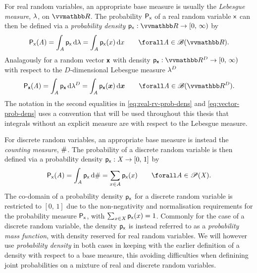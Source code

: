 For real random variables, an appropriate base measure is usually the \emph{Lebesgue measure}, $\lebm{1}$, on $\reals$. The probability $\mathsf{P}_{\mathsf{x}}$ of a real random variable $\mathsf{x}$ can then be defined via a \emph{probability density} $\pden{\rvar{x}} : \reals \to [0,\,\infty)$ by
\begin{equation}\label{eq:real-rv-prob-dens}
    \prob{\rvar{x}}(\set{A})
    = \int_{\set{A}} \pden{\rvar{x}} \,\dr\lebm{1}
    = \int_{\set{A}} \pden{\rvar{x}}(x) \,\dr x
    \qquad
    \forall \set{A} \in \borel(\reals).
\end{equation}
Analagously for a random vector $\boldsymbol{\mathsf{x}}$ with density $\pden{\rvct{x}} : \reals^D \to [0,\,\infty)$ with respect to the $D$-dimensional Lebesgue measure $\lebm{D}$
\begin{equation}\label{eq:vector-prob-dens}
    \prob{\rvct{x}}(\set{A})
    = \int_{\set{A}} \pden{\rvct{x}} \,\dr\lebm{D}
    = \int_{\set{A}} \pden{\rvct{x}}(\vct{x}) \,\dr \vct{x}
    \qquad
    \forall \set{A} \in \borel(\reals^D).
\end{equation}
The notation in the second equalities in \eqref{eq:real-rv-prob-dens} and \eqref{eq:vector-prob-dens} uses a convention that will be used throughout this thesis that integrals without an explicit measure are with respect to the Lebesgue measure. 

For discrete random variables, an appropriate base measure is instead \pagebreak the \emph{counting measure}, $\#$. The probability of a discrete random variable is then defined via a probability density $\mathsf{p}_{\mathsf{x}} : \mathit{X} \to [0,\,1]$ by
\begin{equation}
    \prob{\rvar{x}}(\set{A})
    = \int_{\set{A}} \pden{\rvar{x}} \,\dr\countm
    = \sum_{x \in \set{A}} \pden{\rvar{x}}(x) 
    \qquad
    \forall \set{A} \in \powerset(\set{X}).
\end{equation}
The co-domain of a probability density $\mathsf{p}_{\mathsf{x}}$ for a discrete random variable is restricted to $[0,\,1]$ due to the non-negativity and normalisation requirements for the probability measure $\mathsf{P}_{\mathsf{x}}$, with $\sum_{x\in\mathit{X}} \mathsf{p}_{\mathsf{x}}(x) = 1$. Commonly for the case of a discrete random variable, the density $\mathsf{p}_{\mathsf{x}}$ is instead referred to as a \emph{probability mass function}, with density reserved for real random variables. We will however use \emph{probability density} in both cases in keeping with the earlier definition of a density with respect to a base measure, this avoiding difficulties when definining joint probabilities on a mixture of real and discrete random variables.

